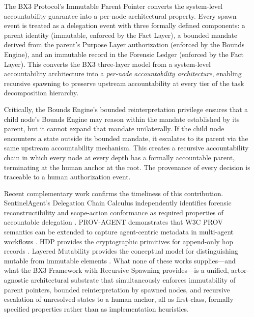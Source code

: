 The BX3 Protocol's Immutable Parent Pointer converts the system-level accountability guarantee into a per-node architectural property. Every spawn event is treated as a delegation event with three formally defined components: a parent identity (immutable, enforced by the Fact Layer), a bounded mandate derived from the parent's Purpose Layer authorization (enforced by the Bounds Engine), and an immutable record in the Forensic Ledger (enforced by the Fact Layer). This converts the BX3 three-layer model from a system-level accountability architecture into a \textit{per-node accountability architecture}, enabling recursive spawning to preserve upstream accountability at every tier of the task decomposition hierarchy.

Critically, the Bounds Engine's bounded reinterpretation privilege ensures that a child node's Bounds Engine may reason within the mandate established by its parent, but it cannot expand that mandate unilaterally. If the child node encounters a state outside its bounded mandate, it escalates to its parent via the same upstream accountability mechanism. This creates a recursive accountability chain in which every node at every depth has a formally accountable parent, terminating at the human anchor at the root. The provenance of every decision is traceable to a human authorization event.

Recent complementary work confirms the timeliness of this contribution. SentinelAgent's Delegation Chain Calculus independently identifies forensic reconstructibility and scope-action conformance as required properties of accountable delegation \cite{sentinelagent2026}. PROV-AGENT demonstrates that W3C PROV semantics can be extended to capture agent-centric metadata in multi-agent workflows \cite{provcagent2025}. HDP provides the cryptographic primitives for append-only hop records \cite{hdp2025arxiv}. Layered Mutability provides the conceptual model for distinguishing mutable from immutable elements \cite{layeredmutability2026}. What none of these works supplies---and what the BX3 Framework with Recursive Spawning provides---is a unified, actor-agnostic architectural substrate that simultaneously enforces immutability of parent pointers, bounded reinterpretation by spawned nodes, and recursive escalation of unresolved states to a human anchor, all as first-class, formally specified properties rather than as implementation heuristics.


